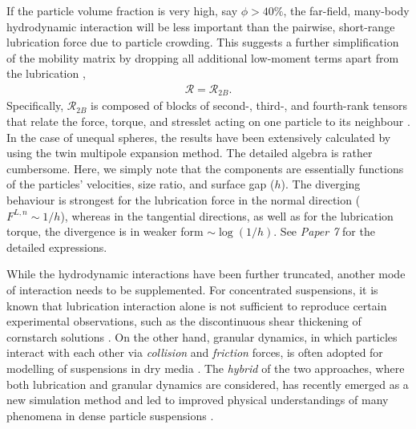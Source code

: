 If the particle volume fraction is very high, say $\phi > 40\%$, the far-field, many-body hydrodynamic interaction will be less important than the pairwise, short-range lubrication force due to particle crowding. This suggests a further simplification of the mobility matrix by dropping all additional low-moment terms apart from the lubrication \citep{Ball_Melrose_1997}, \ie
\begin{equation} 
 \begin{aligned}
  \mathscr{R} = \mathscr{R}_{2B} .
 \end{aligned}
\end{equation}
Specifically, $\mathscr{R}_{2B}$ is composed of blocks of second-, third-, and fourth-rank tensors that relate the force, torque, and stresslet acting on one particle to its neighbour \citep{kim_karrila}.
In the case of unequal spheres, the results have been extensively calculated by \cite{jeffrey_onishi_1984, jeffrey1992} using the twin multipole expansion method.
The detailed algebra is rather cumbersome. Here, we simply note that the components are essentially functions of the particles' velocities, size ratio, and surface gap ($h$). The diverging behaviour is strongest for the lubrication force in the normal direction ($F^{L,n} \sim 1/h$), whereas in the tangential directions, as well as for the lubrication torque, the divergence is in weaker form $\sim \log(1/h)$. See \emph{Paper 7} for the detailed expressions.

While the hydrodynamic interactions have been further truncated, another mode of interaction needs to be supplemented.
For concentrated suspensions, it is known that lubrication interaction alone is not sufficient to reproduce certain experimental observations, such as the discontinuous shear thickening of cornstarch solutions \citep{Morris_annurev2020}.
On the other hand, granular dynamics, in which particles interact with each other via \emph{collision} and \emph{friction} forces, is often adopted for modelling of suspensions in dry media \citep{campbell_brennen_1985}.
The \emph{hybrid} of the two approaches, where both lubrication and granular dynamics are considered, has recently emerged as a new simulation method and led to improved physical understandings of many phenomena in dense particle suspensions \citep{Trulsson_Andreotti_Claudin, Seto_PRL2013, Mari_Seto_2014JoR, Cheal_Ness_2018, Ness_Mari_Cates}.

